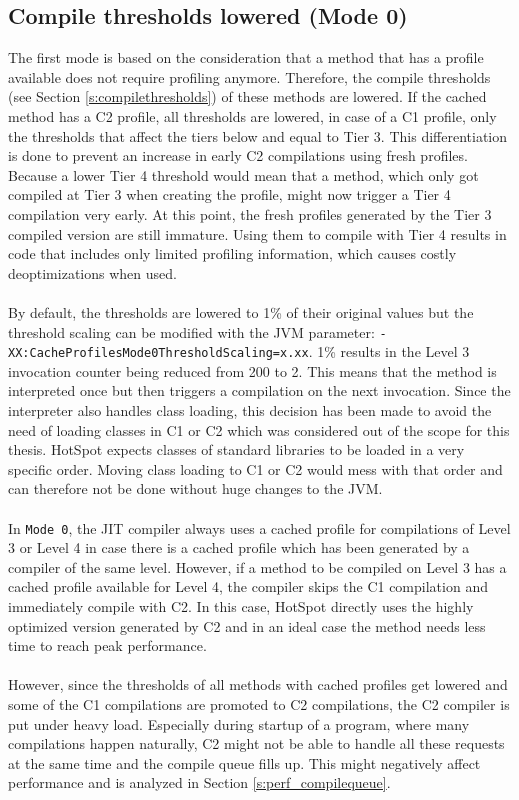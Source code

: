 \subsection{Compile thresholds lowered (Mode 0)}
\label{s:mode0}
The first mode is based on the consideration that a method that has a profile available does not require profiling anymore. Therefore, the compile thresholds (see Section \ref{s:compilethresholds}) of these methods are lowered. If the cached method has a C2 profile, all thresholds are lowered, in case of a C1 profile, only the thresholds that affect the tiers below and equal to Tier 3. This differentiation is done to prevent an increase in early C2 compilations using fresh profiles. Because a lower Tier 4 threshold would mean that a method, which only got compiled at Tier 3 when creating the profile, might now trigger a Tier 4 compilation very early. At this point, the fresh profiles generated by the Tier 3 compiled version are still immature. Using them to compile with Tier 4 results in code that includes only limited profiling information, which causes costly deoptimizations when used. 
\\\\
By default, the thresholds are lowered to 1\% of their original values but the threshold scaling can be modified with the JVM parameter: \texttt{-XX:CacheProfilesMode0ThresholdScaling=x.xx}. 1\% results in the Level 3 invocation counter being reduced from 200 to 2. This means that the method is interpreted once but then triggers a compilation on the next invocation.
Since the interpreter also handles class loading, this decision has been made to avoid the need of loading classes in C1 or C2 which was considered out of the scope for this thesis. HotSpot expects classes of standard libraries to be loaded in a very specific order. Moving class loading to C1 or C2 would mess with that order and can therefore not be done without huge changes to the JVM.
\\\\
In \texttt{Mode 0}, the JIT compiler always uses a cached profile for compilations of Level 3 or Level 4 in case there is a cached profile which has been generated by a compiler of the same level. However, if a method to be compiled on Level 3 has a cached profile available for Level 4, the compiler skips the C1 compilation and immediately compile with C2. In this case, HotSpot directly uses the highly optimized version generated by C2 and in an ideal case the method needs less time to reach peak performance.
\\\\
However, since the thresholds of all methods with cached profiles get lowered and some of the C1 compilations are promoted to C2 compilations, the C2 compiler is put under heavy load. Especially during startup of a program, where many compilations happen naturally, C2 might not be able to handle all these requests at the same time and the compile queue fills up. This might negatively affect performance and is analyzed in Section \ref{s:perf_compilequeue}.

